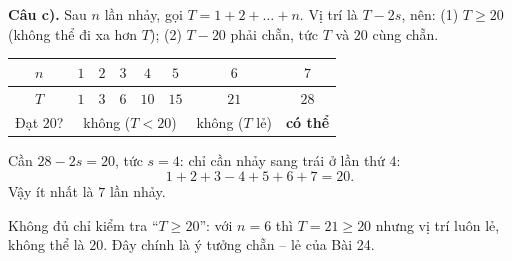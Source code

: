 {\par\smallskip\textbf{Câu c).}
Sau $n$ lần nhảy, gọi $T=1+2+\dots+n$. Vị trí là $T-2s$, nên: (1) $T\ge 20$ (không thể đi xa hơn $T$); (2) $T-20$ phải chẵn, tức $T$ và $20$ cùng chẵn.

\begin{center}
\begin{tabular}{|c|c|c|c|c|c|c|c|}
\hline
\rowcolor{Tint}$n$ & $1$ & $2$ & $3$ & $4$ & $5$ & $6$ & $7$\\
\hline
$T$ & $1$ & $3$ & $6$ & $10$ & $15$ & $21$ & $28$\\
\hline
Đạt $20$? & \multicolumn{5}{c|}{không ($T<20$)} & không ($T$ lẻ) & \textbf{có thể}\\
\hline
\end{tabular}
\end{center}

Cần $28-2s=20$, tức $s=4$: chỉ cần nhảy sang trái ở lần thứ $4$:
\[1+2+3-4+5+6+7=20.\]
Vậy ít nhất là $7$ lần nhảy.

\begin{warnbox}Không đủ chỉ kiểm tra ``$T\ge 20$'': với $n=6$ thì $T=21\ge 20$ nhưng vị trí luôn lẻ, không thể là $20$. Đây chính là ý tưởng chẵn -- lẻ của Bài 24.\end{warnbox}

}

